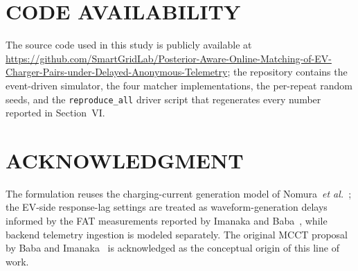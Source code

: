\documentclass{ieeeaccess}
\begin{document}
    \section*{CODE AVAILABILITY}
    The source code used in this study is publicly available at \url{https://github.com/SmartGridLab/Posterior-Aware-Online-Matching-of-EV-Charger-Pairs-under-Delayed-Anonymous-Telemetry}; the repository contains the event-driven simulator, the four matcher implementations, the per-repeat random seeds, and the \texttt{reproduce\_all} driver script that regenerates every number reported in Section~VI.

    \section*{ACKNOWLEDGMENT}
    The formulation reuses the charging-current generation model of Nomura~\textit{et al.}~\cite{b14}; the EV-side response-lag settings are treated as waveform-generation delays informed by the FAT measurements reported by Imanaka and Baba~\cite{bimanaka25}, while backend telemetry ingestion is modeled separately. The original MCCT proposal by Baba and Imanaka~\cite{b13} is acknowledged as the conceptual origin of this line of work.
\end{document}

